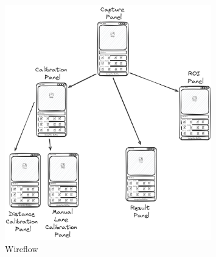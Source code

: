\begin{figure}[!ht]
    \centering
    \includegraphics[width=0.8\textwidth]{texs/Part2/chapter3/image/wireflow.png}
    \caption{Wireflow}
    \label{fig:wireflow}
\end{figure}










